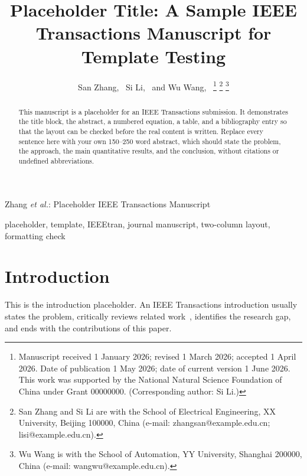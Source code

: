 \documentclass[journal,10pt]{IEEEtran}
\begin{document}
\title{Placeholder Title: A Sample IEEE Transactions Manuscript for Template Testing}

\author{San Zhang,~
  Si Li,~
  and Wu Wang,~%
\thanks{Manuscript received 1 January 2026; revised 1 March 2026; accepted 1 April 2026.
  Date of publication 1 May 2026; date of current version 1 June 2026. This work was
  supported by the National Natural Science Foundation of China under Grant 00000000.
  (Corresponding author: Si Li.)}%
\thanks{San Zhang and Si Li are with the School of Electrical Engineering, XX University,
  Beijing 100000, China (e-mail: zhangsan@example.edu.cn; lisi@example.edu.cn).}%
\thanks{Wu Wang is with the School of Automation, YY University, Shanghai 200000, China
  (e-mail: wangwu@example.edu.cn).}}

%
{Zhang \MakeLowercase{\textit{et al.}}: Placeholder IEEE Transactions Manuscript}

\maketitle

\begin{abstract}
This manuscript is a placeholder for an IEEE Transactions submission. It demonstrates the
title block, the abstract, a numbered equation, a table, and a bibliography entry so that
the layout can be checked before the real content is written. Replace every sentence here
with your own 150--250 word abstract, which should state the problem, the approach, the
main quantitative results, and the conclusion, without citations or undefined abbreviations.
\end{abstract}

\begin{IEEEkeywords}
\raggedright
placeholder, template, IEEEtran, journal manuscript, two-column layout, formatting check
\end{IEEEkeywords}

\section{Introduction}
\label{sec:intro}
This is the introduction placeholder. An IEEE Transactions introduction
usually states the problem, critically reviews related work~\cite{lecun2015deep,he2016resnet},
identifies the research gap, and ends with the contributions of this paper.
\end{document}
